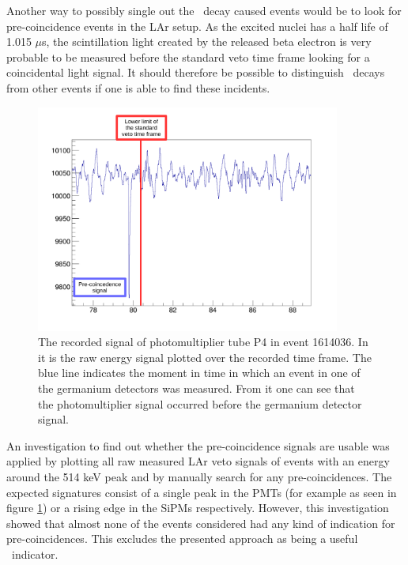 \documentclass[encoding=utf8,british]{tumphthesis}
\begin{document}
Another way to possibly single out the \Kr\ decay caused events would be to look for pre-coincidence events in the LAr setup.
As the excited  nuclei has a half life of 1.015 $\mu$s, the scintillation light created by the released beta electron is very probable to be measured before the standard veto time frame looking for a coincidental light signal.
It should therefore be possible to distinguish \Kr\ decays from other events if one is able to find these incidents.
\\


\begin{figure}[t!]
	\centering
	\ifmakefigures%
	\includegraphics[width=100mm]{./Bilder/BeispielSignal.pdf}
	\fi%

	\caption{
    The recorded signal of photomultiplier tube P4 in event 1614036. 
    In it is the raw energy signal plotted over the recorded time frame. 
    The blue line indicates the moment in time in which an event in one of the germanium detectors was measured. 
    From it one can see that the photomultiplier signal occurred before the germanium detector signal.   
    }
    	\label{fig:BeispielSignal}
    			\vspace{5mm}
\end{figure}


An investigation to find out whether the pre-coincidence signals are usable was applied by plotting all raw measured LAr veto signals of events with an energy around the 514 keV peak and by manually search for any pre-coincidences.
The expected signatures consist of a single peak in the PMTs (for example as seen in figure \ref{fig:BeispielSignal}) or a rising edge in the SiPMs respectively.
However, this investigation showed that almost none of the events considered had any kind of indication for pre-coincidences.
This excludes the presented approach as being a useful \Kr\ indicator.
\end{document}
